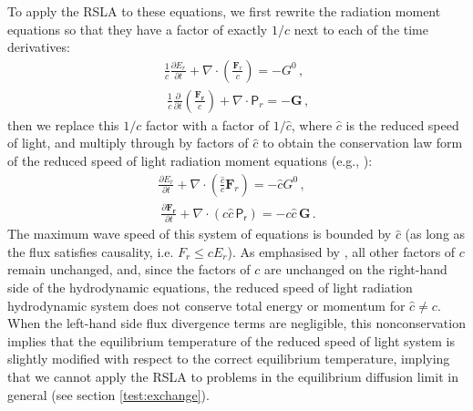 \documentclass[fleqn,usenatbib]{mnras}
\newcommand{\vc}[1]{{\mathbf{#1}}}
\begin{document}
To apply the RSLA to these equations, we first rewrite the radiation moment equations so that they have a factor of exactly $1/c$ next to each of the time derivatives:
\begin{align}
    \frac{1}{c} \frac{\partial E_r}{\partial t} + \nabla \cdot \left( \frac{\vc{F}_r}{c} \right) = -G^0 \, , \\\
    \frac{1}{c} \frac{\partial}{\partial t} \left( \frac{\vc{F_r}}{c} \right) + \nabla \cdot \mathsf{P}_r = -\vc{G} \, ,
\end{align}
then we replace this $1/c$ factor with a factor of $1/\hat c$, where $\hat c$ is the reduced speed of light, and multiply through by factors of $\hat c$ to obtain the conservation law form of the reduced speed of light radiation moment equations (e.g., \citealt{Skinner_2013}):
\begin{align}
    \frac{\partial E_r}{\partial t} + \nabla \cdot \left( \frac{\hat c}{c} \vc{F}_r \right) = -\hat c G^0 \, , \\\
    \frac{\partial \vc{F_r}}{\partial t} + \nabla \cdot (c \hat c \, \mathsf{P_r}) = -c \hat c \, \vc{G} \, .
\end{align}
The maximum wave speed of this system of equations is bounded by $\hat c$ (as long as the flux satisfies causality, i.e. $F_r \leq cE_r$). As emphasised by \cite{Skinner_2013}, all other factors of $c$ remain unchanged, and, since the factors of $c$ are unchanged on the right-hand side of the hydrodynamic equations, the reduced speed of light radiation hydrodynamic system does not conserve total energy or momentum for $\hat{c} \neq c$. 
When the left-hand side flux divergence terms are negligible, this nonconservation implies that the equilibrium temperature of the reduced speed of light system is slightly modified with respect to the correct equilibrium temperature, implying that we cannot apply the RSLA to problems in the equilibrium diffusion limit in general (see section \ref{test:exchange}).
\end{document}
